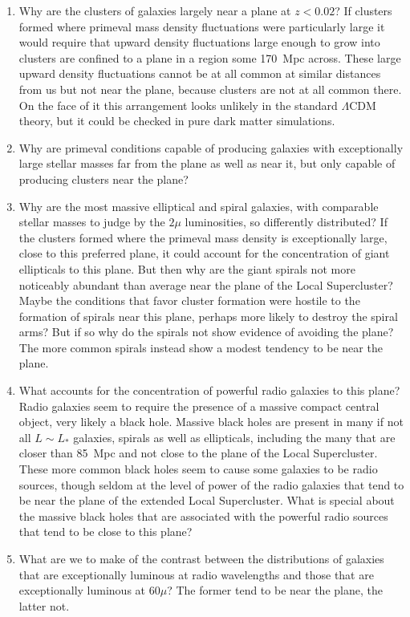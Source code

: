 \documentclass[fleqn,usenatbib]{mnras}
\begin{document}
\begin{enumerate}[label*=\arabic*.]

\item  Why are the clusters of galaxies largely near a plane at $z<0.02$? If clusters formed where primeval mass density fluctuations were particularly large it would require that upward density fluctuations large enough to grow into clusters are confined to a plane in a region some 170~Mpc across. These large upward density fluctuations cannot be at all common at similar distances from us but not near the plane, because clusters are not at all common there. On the face of it this arrangement looks unlikely in the standard $\Lambda$CDM theory, but it could be checked in pure dark matter simulations.

\item Why are primeval conditions capable of producing galaxies with exceptionally large stellar masses far from the plane as well as near it, but only capable of producing clusters near the plane?

\item Why are the most massive elliptical and spiral galaxies, with comparable stellar masses to judge by the $2\mu$ luminosities, so differently distributed? If the clusters formed where the primeval mass density is exceptionally large, close to this preferred plane, it could account for the concentration of giant ellipticals to this plane. But then why are the giant spirals not more noticeably abundant than average near the plane of the Local Supercluster? Maybe the conditions that favor cluster formation were hostile to the formation of spirals near this plane, perhaps more likely to destroy the spiral arms? But if so why do the spirals not show evidence of avoiding the plane? The more common spirals instead show a modest tendency to be near the plane.

\item What accounts for the concentration of powerful radio galaxies to this plane? Radio galaxies seem to require the presence of a massive compact central object, very likely a black hole. Massive black holes are present in many if not all $L\sim L_\ast$ galaxies, spirals as well as ellipticals, including the many that are closer than 85~Mpc and not close to the plane of the Local Supercluster. These more common black holes seem to cause some galaxies to be radio sources, though seldom at the level of power of the radio galaxies that tend to be near the plane of the extended Local Supercluster. What is special about the massive black holes that are associated with the powerful radio sources that tend to be close to this plane?

\item What are we to make of the contrast between the distributions of galaxies that are exceptionally luminous  at radio wavelengths and those that are exceptionally luminous at $60\mu$? The former tend to be near the plane, the latter not. 

\end{enumerate}
\end{document}
